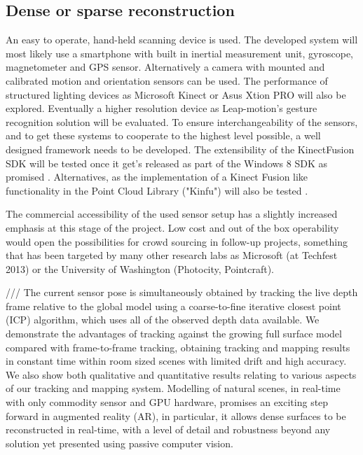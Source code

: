 \documentclass{ucl_thesis}
\begin{document}
\subsection{Dense or sparse reconstruction}

\par An easy to operate, hand-held scanning device is used. The developed system will most likely use a smartphone with built in inertial measurement unit, gyroscope, magnetometer and GPS sensor. Alternatively a camera with mounted and calibrated motion and orientation sensors can be used. The performance of structured lighting devices as Microsoft Kinect \cite{Kinect} or Asus Xtion PRO \cite{XtionPro} will also be explored. Eventually a higher resolution device as Leap-motion's gesture recognition solution \cite{LeapMotion} will be evaluated. To ensure interchangeability of the sensors, and to get these systems to cooperate to the highest level possible, a well designed framework needs to be developed. The extensibility of the KinectFusion SDK will be tested once it get's released as part of the Windows 8 SDK as promised \cite{SDKKinectFusion}. Alternatives, as the implementation of a Kinect Fusion like functionality in the Point Cloud Library ("Kinfu") will also be tested \cite{KinFu}.
\par The commercial accessibility of the used sensor setup has a slightly increased emphasis at this stage of the project. Low cost and out of the box operability would open the possibilities for crowd sourcing in follow-up projects, something that has been targeted by many other research labs as Microsoft (at Techfest 2013) or the University of Washington (Photocity, Pointcraft).

/// The current sensor pose is simultaneously obtained by
tracking the live depth frame relative to the global model using a
coarse-to-fine iterative closest point (ICP) algorithm, which uses
all of the observed depth data available. We demonstrate the advantages
of tracking against the growing full surface model compared
with frame-to-frame tracking, obtaining tracking and mapping results
in constant time within room sized scenes with limited drift
and high accuracy. We also show both qualitative and quantitative
results relating to various aspects of our tracking and mapping system.
Modelling of natural scenes, in real-time with only commodity
sensor and GPU hardware, promises an exciting step forward
in augmented reality (AR), in particular, it allows dense surfaces to
be reconstructed in real-time, with a level of detail and robustness
beyond any solution yet presented using passive computer vision.
\end{document}
